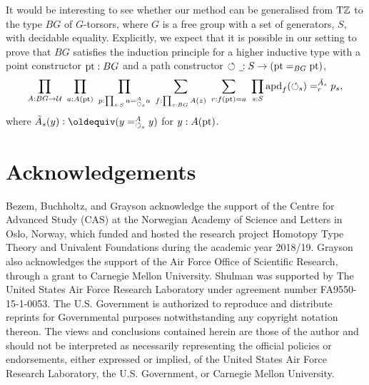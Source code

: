 \documentclass[a4paper,12pt]{amsart}
\begin{document}
It would be interesting to see whether our method can be generalised
from ${\mathrm{T}\mathbb{Z}}$ to the type $BG$ of $G$-torsors, where $G$ is a free group with
a set of generators, $S$, with decidable equality.
Explicitly, we expect that it is possible in our setting to
prove that $BG$ satisfies the induction principle for a higher inductive
type with a point constructor ${\mathord{\mathrm{pt}}} : BG$ and a path constructor
$\Zloop_{\blank} : S \to (\pt =_{BG} \pt)$,
\[
  \prod_{A: BG\to\mathcal{U}}~
  \prod_{a: A({\mathord{\mathrm{pt}}})}~
  \prod_{p: \prod_{s:S} a=^A_{{\circlearrowleft}_s} a}~
  \sum_{f: \prod_{z:BG} A(z)}~
  \sum_{r: f({\mathord{\mathrm{pt}}})= a}~
  \prod_{s:S}\mathop{{\mathrm{apd}}_{f}}({\circlearrowleft}_s) =^{\tilde A_s}_r p_s,
\]
where $\tilde A_s(y) \defeq (y =^A_{\Zloop_s} y)$ for $y : A({\mathord{\mathrm{pt}}})$.

\section*{Acknowledgements}

Bezem, Buchholtz, and Grayson acknowledge the support of the Centre for Advanced Study (CAS)
at the Norwegian Academy of Science and Letters
in Oslo, Norway, which funded and hosted the research project Homotopy Type Theory and Univalent Foundations during the academic year 2018/19.
Grayson also acknowledges the support of the Air Force Office of Scientific Research, through a grant to Carnegie Mellon University.
Shulman was supported by The United States Air Force Research
    Laboratory under agreement number FA9550-15-1-0053.  The
    U.S. Government is authorized to reproduce and distribute reprints
    for Governmental purposes notwithstanding any copyright notation
    thereon.  The views and conclusions contained herein are those of
    the author and should not be interpreted as necessarily
    representing the official policies or endorsements, either
    expressed or implied, of the United States Air Force Research
    Laboratory, the U.S. Government, or Carnegie Mellon University.

\raggedright
\printbibliography
\end{document}
